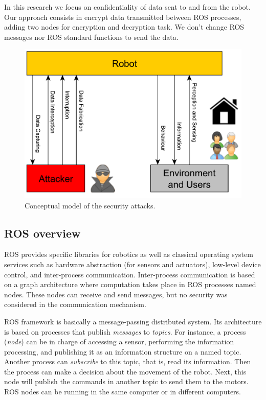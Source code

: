 \documentclass[journal,twoside]{JoPhA}
\begin{document}
In this research we focus on confidentiality of data sent to and from the robot. Our approach consists in encrypt data transmitted between ROS processes, adding two nodes for encryption and decryption task. We don't change ROS messages nor ROS standard functions to send the data. 


\begin{figure}[ht]
    \centering
    \includegraphics[width=.5\textwidth]{RobotsAttacks.pdf}
    \caption{Conceptual model of the security attacks.}
  \label{fig:Conceptualmodel}
\end{figure}


\subsection{ROS overview}

ROS provides specific libraries for robotics as well as classical operating system services such as hardware abstraction (for sensors and actuators), low-level device control, and inter-process communication. Inter-process communication is based on a graph architecture where computation takes place in ROS processes named nodes. These nodes can receive and send messages, but no security was considered in the communication mechanism.

ROS framework is basically a message-passing distributed system. Its architecture is based on processes that publish {\em messages} to {\em topics}. For instance, a process ({\em node}) can be in charge of accessing a sensor, performing the information processing, and publishing it as an information structure on a named topic. Another process can {\em subscribe} to this topic, that is, read its information. Then the process can make a decision about the movement of the robot. Next, this node will publish the commands in another topic to send them to the motors. ROS nodes can be running in the same computer or in different computers.
\end{document}
